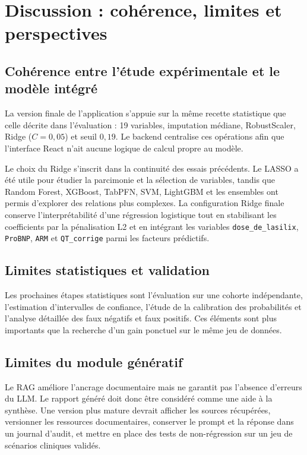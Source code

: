 \documentclass[12pt,a4paper]{report}
\begin{document}
\section{Discussion : cohérence, limites et perspectives}

\subsection{Cohérence entre l'étude expérimentale et le modèle intégré}

La version finale de l'application s'appuie sur la même recette statistique que celle
décrite dans l'évaluation : 19 variables, imputation médiane, RobustScaler, Ridge
($C=0{,}05$) et seuil $0{,}19$. Le backend centralise ces opérations afin que l'interface React n'ait
aucune logique de calcul propre au modèle.

Le choix du Ridge s'inscrit dans la continuité des essais précédents. Le LASSO a
été utile pour étudier la parcimonie et la sélection de variables, tandis que Random Forest,
XGBoost, TabPFN, SVM, LightGBM et les ensembles ont permis d'explorer des relations plus
complexes. La configuration Ridge finale conserve l'interprétabilité d'une régression
logistique tout en stabilisant les coefficients par la pénalisation L2 et en intégrant les variables \texttt{dose\_de\_lasilix}, \texttt{ProBNP}, \texttt{ARM} et \texttt{QT\_corrige} parmi les facteurs prédictifs.\subsection{Limites statistiques et validation}


Les prochaines étapes statistiques sont l'évaluation sur une cohorte indépendante,
l'estimation d'intervalles de confiance, l'étude de la calibration des probabilités et
l'analyse détaillée des faux négatifs et faux positifs. Ces éléments sont plus importants
que la recherche d'un gain ponctuel sur le même jeu de données.

\subsection{Limites du module génératif}

Le RAG améliore l'ancrage documentaire mais ne garantit pas l'absence d'erreurs du LLM.
Le rapport généré doit donc être considéré comme une aide à la synthèse. Une version plus
mature devrait afficher les sources récupérées, versionner les ressources documentaires, conserver le prompt
et la réponse dans un journal d'audit, et mettre en place des tests de non-régression sur
un jeu de scénarios cliniques validés.
\end{document}
